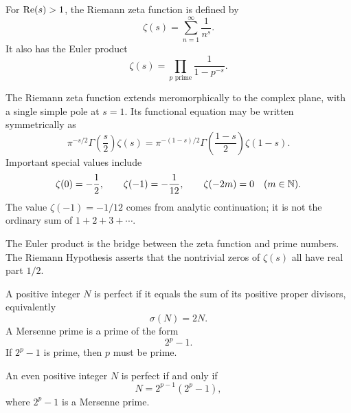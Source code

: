     \begin{definition}
        For $\operatorname{Re}(s)>1$, the Riemann zeta function is defined by
        \[
            \zeta(s)
            =
            \sum_{n=1}^{\infty}\frac{1}{n^s}.
        \]
        It also has the Euler product
        \[
            \zeta(s)
            =
            \prod_{p\text{ prime}}
            \frac{1}{1-p^{-s}}.
        \]
    \end{definition}

    \begin{fact}
        The Riemann zeta function extends meromorphically to the complex plane,
        with a single simple pole at $s=1$. Its functional equation may be
        written symmetrically as
        \[
            \pi^{-s/2}\Gamma\!\left(\frac{s}{2}\right)\zeta(s)
            =
            \pi^{-(1-s)/2}\Gamma\!\left(\frac{1-s}{2}\right)\zeta(1-s).
        \]
        Important special values include
        \[
            \zeta(0)=-\frac12,
            \qquad
            \zeta(-1)=-\frac1{12},
            \qquad
            \zeta(-2m)=0\quad(m\in\mathbb{N}).
        \]
        The value $\zeta(-1)=-1/12$ comes from analytic continuation; it is not
        the ordinary sum of $1+2+3+\cdots$.
    \end{fact}

    \begin{remark}
        The Euler product is the bridge between the zeta function and prime
        numbers. The Riemann Hypothesis asserts that the nontrivial zeros of
        $\zeta(s)$ all have real part $1/2$.
    \end{remark}

    \begin{definition}
        A positive integer $N$ is perfect if it equals the sum of its positive
        proper divisors, equivalently
        \[
            \sigma(N)=2N.
        \]
        A Mersenne prime is a prime of the form
        \[
            2^p-1.
        \]
        If $2^p-1$ is prime, then $p$ must be prime.
    \end{definition}

    \begin{theorem}
        An even positive integer $N$ is perfect if and only if
        \[
            N=2^{p-1}(2^p-1),
        \]
        where $2^p-1$ is a Mersenne prime.
    \end{theorem}

